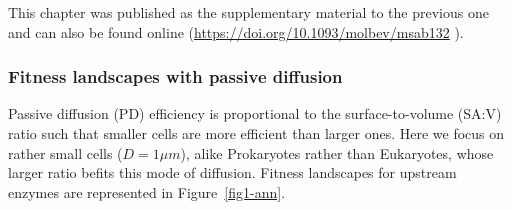 This chapter was published as the supplementary material to the previous one and can also be found online (\url{https://doi.org/10.1093/molbev/msab132} ).

\subsubsection{Fitness landscapes with passive diffusion\label{sec:FLPD}}

Passive diffusion (PD) efficiency is proportional to the surface-to-volume (SA:V) ratio such that smaller cells are more efficient than larger ones. Here we focus on rather small cells ($D=1\mu m$), alike Prokaryotes rather than Eukaryotes, whose larger ratio befits this mode of diffusion. Fitness landscapes for upstream enzymes are represented in Figure~\ref{fig1-ann}.

